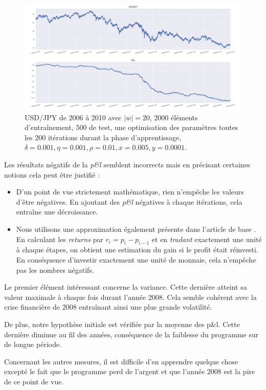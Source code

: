 \documentclass[a4paper, 11pt]{article}
\begin{document}
\begin{figure}
	\centering
	\includegraphics[scale=0.5]{res/usdjpy_2006-2010}
	\caption{USD/JPY de 2006 à 2010 avec $|w| = 20$, $2000$ éléments d'entraînement, $500$ de test, une optimisation des
		paramètres toutes les $200$ itérations durant la phase d'apprentissage, $\delta = 0.001, \eta=0.001,\rho=0.01, x = 0.005, y=0.0001$.}
\end{figure}
\clearpage

Les résultats négatifs de la \textit{p\&l} semblent incorrects mais en précisant certaines notions cela peut être justifié :
\begin{itemize}
	\item D'un point de vue strictement mathématique, rien n'empêche les valeurs d'être négatives. En ajoutant des \textit{p\&l} négatives à chaque itérations, cela entraîne une décroissance.
	\item Nous utilisons une approximation également présente dans l'article de base \cite{machine_learning_automated_trading}. En calculant les \textit{returns} par $r_i = p_{i} - p_{i-1}$ et en \textit{tradant} exactement une unité à chaque étapes, on obtient une estimation du gain si le profit était réinvesti. En conséquence d'investir exactement une unité de monnaie, cela n'empêche pas les nombres négatifs.
\end{itemize}

Le premier élément intéressant concerne la variance. Cette dernière atteint sa valeur maximale à chaque fois durant l'année 2008. Cela semble cohérent avec la crise financière de 2008 entraînant ainsi une plus grande volatilité.

De plus, notre hypothèse initiale est vérifiée par la moyenne des p\&l. Cette dernière diminue au fil des années, conséquence de la faiblesse du programme sur de longue période.

Concernant les autres mesures, il est difficile d'en apprendre quelque chose excepté le fait que le programme perd de l'argent et que l'année 2008 est la pire de ce point de vue.
\end{document}
